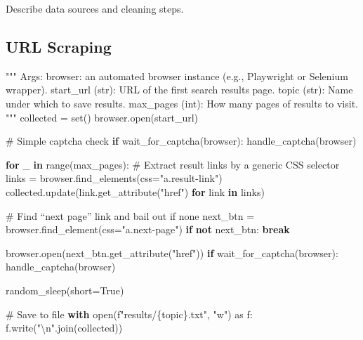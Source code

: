 \documentclass[
  titlepage]{article}
\newenvironment{Shaded}{\begin{snugshade}}{\end{snugshade}}
\newcommand{\BuiltInTok}[1]{\textcolor[rgb]{0.00,0.23,0.31}{#1}}
\newcommand{\CharTok}[1]{\textcolor[rgb]{0.13,0.47,0.30}{#1}}
\newcommand{\CommentTok}[1]{\textcolor[rgb]{0.37,0.37,0.37}{#1}}
\newcommand{\ControlFlowTok}[1]{\textcolor[rgb]{0.00,0.23,0.31}{\textbf{#1}}}
\newcommand{\ImportTok}[1]{\textcolor[rgb]{0.00,0.46,0.62}{#1}}
\newcommand{\KeywordTok}[1]{\textcolor[rgb]{0.00,0.23,0.31}{\textbf{#1}}}
\newcommand{\NormalTok}[1]{\textcolor[rgb]{0.00,0.23,0.31}{#1}}
\newcommand{\OperatorTok}[1]{\textcolor[rgb]{0.37,0.37,0.37}{#1}}
\newcommand{\SpecialCharTok}[1]{\textcolor[rgb]{0.37,0.37,0.37}{#1}}
\newcommand{\SpecialStringTok}[1]{\textcolor[rgb]{0.13,0.47,0.30}{#1}}
\newcommand{\StringTok}[1]{\textcolor[rgb]{0.13,0.47,0.30}{#1}}
\newcommand{\VariableTok}[1]{\textcolor[rgb]{0.07,0.07,0.07}{#1}}
\begin{document}
Describe data sources and cleaning steps.

\subsection{URL Scraping}\label{url-scraping}

\begin{Shaded}
\begin{Highlighting}[]
\CommentTok{"""}
\CommentTok{Args:}
\CommentTok{    browser: an automated browser instance (e.g., Playwright or Selenium wrapper).}
\CommentTok{    start\_url (str): URL of the first search results page.}
\CommentTok{    topic (str): Name under which to save results.}
\CommentTok{    max\_pages (int): How many pages of results to visit.}
\CommentTok{"""}
\NormalTok{collected }\OperatorTok{=} \BuiltInTok{set}\NormalTok{()}
\NormalTok{browser.}\BuiltInTok{open}\NormalTok{(start\_url)}

\CommentTok{\# Simple captcha check}
\ControlFlowTok{if}\NormalTok{ wait\_for\_captcha(browser):}
\NormalTok{    handle\_captcha(browser)}

\ControlFlowTok{for}\NormalTok{ \_ }\KeywordTok{in} \BuiltInTok{range}\NormalTok{(max\_pages):}
    \CommentTok{\# Extract result links by a generic CSS selector}
\NormalTok{    links }\OperatorTok{=}\NormalTok{ browser.find\_elements(css}\OperatorTok{=}\StringTok{"a.result{-}link"}\NormalTok{)}
\NormalTok{    collected.update(link.get\_attribute(}\StringTok{"href"}\NormalTok{) }\ControlFlowTok{for}\NormalTok{ link }\KeywordTok{in}\NormalTok{ links)}
    
    \CommentTok{\# Find “next page” link and bail out if none}
\NormalTok{    next\_btn }\OperatorTok{=}\NormalTok{ browser.find\_element(css}\OperatorTok{=}\StringTok{"a.next{-}page"}\NormalTok{)}
    \ControlFlowTok{if} \KeywordTok{not}\NormalTok{ next\_btn:}
        \ControlFlowTok{break}
    
\NormalTok{    browser.}\BuiltInTok{open}\NormalTok{(next\_btn.get\_attribute(}\StringTok{"href"}\NormalTok{))}
    \ControlFlowTok{if}\NormalTok{ wait\_for\_captcha(browser):}
\NormalTok{        handle\_captcha(browser)}
    
\NormalTok{    random\_sleep(short}\OperatorTok{=}\VariableTok{True}\NormalTok{)}

\CommentTok{\# Save to file}
\ControlFlowTok{with} \BuiltInTok{open}\NormalTok{(}\SpecialStringTok{f"results/}\SpecialCharTok{\{}\NormalTok{topic}\SpecialCharTok{\}}\SpecialStringTok{.txt"}\NormalTok{, }\StringTok{"w"}\NormalTok{) }\ImportTok{as}\NormalTok{ f:}
\NormalTok{    f.write(}\StringTok{"}\CharTok{\textbackslash{}n}\StringTok{"}\NormalTok{.join(collected))}
\end{Highlighting}
\end{Shaded}
\end{document}
